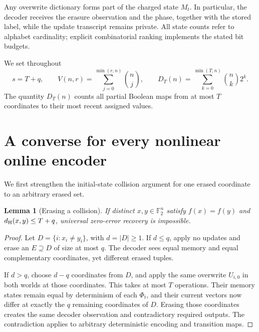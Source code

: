 \documentclass[11pt,a4paper]{article}
\newtheorem{lemma}[theorem]{Lemma}
\newcommand{\F}{\mathbb F_2}
\newcommand{\dist}{d_{\rm H}}
\begin{document}
Any overwrite dictionary forms part of the charged state $M_t$. In particular, the decoder receives the erasure observation and the phase, together with the stored label, while the update transcript remains private. All state counts refer to alphabet cardinality; explicit combinatorial ranking implements the stated bit budgets.

We set throughout
\[
 s=T+q,\qquad V(n,r)=\sum_{j=0}^{\min(r,n)}\binom nj,\qquad D_T(n)=\sum_{k=0}^{\min(T,n)}\binom nk2^k.
\]
The quantity $D_T(n)$ counts all partial Boolean maps from at most $T$ coordinates to their most recent assigned values.

\section{A converse for every nonlinear online encoder}
We first strengthen the initial-state collision argument for one erased coordinate to an arbitrary erased set.

\begin{lemma}[Erasing a collision]\label{lem:collision}
If distinct $x,y\in\F^n$ satisfy $f(x)=f(y)$ and $\dist(x,y)\le T+q$, universal zero-error recovery is impossible.
\end{lemma}
\begin{proof}
Let $D=\{i:x_i\ne y_i\}$, with $d=|D|\ge1$. If $d\le q$, apply no updates and erase an $E\supseteq D$ of size at most $q$. The decoder sees equal memory and equal complementary coordinates, yet different erased tuples.

If $d>q$, choose $d-q$ coordinates from $D$, and apply the same overwrite $U_{i,0}$ in both worlds at those coordinates. This takes at most $T$ operations. Their memory states remain equal by determinism of each $\Phi_t$, and their current vectors now differ at exactly the $q$ remaining coordinates of $D$. Erasing those coordinates creates the same decoder observation and contradictory required outputs. The contradiction applies to arbitrary deterministic encoding and transition maps.
\end{proof}
\end{document}
